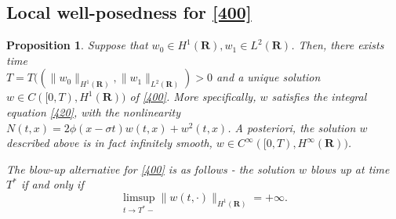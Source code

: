 \documentclass[12pt]{amsart}
\newtheorem{proposition}{Proposition}
\theoremstyle{definition}
\theoremstyle{remark}
\numberwithin{equation}{section}
\renewcommand{\(}{\left(}
\renewcommand{\)}{\right)}
\renewcommand{\[}{\left[}
\renewcommand{\]}{\right]}
\newcommand{\si}{\sigma}
\newcommand{\rone}{\mathbf R}
\begin{document}
\subsection{Local well-posedness for \eqref{400}}
\begin{proposition}
	\label{prop:54} 
	Suppose that $w_0\in H^1(\rone), w_1\in L^2(\rone)$. Then, there exists time \\  $T=T((\|w_0\|_{H^1(\rone)}, \|w_1\|_{L^2(\rone)})>0$ and a unique solution 
	$w\in C([0,T), H^1(\rone))$ of \eqref{400}. More specifically, $w$ satisfies the integral equation \eqref{420}, with the nonlinearity $N(t,x)=2\phi(x-\si t)w(t,x) +w^2(t,x)$. 
	A posteriori, the solution $w$ described above is in fact infinitely smooth, $w\in C^\infty([0,T), H^\infty(\rone))$. 
	
	The blow-up alternative for \eqref{400} is as follows - the solution $w$ blows up at time $T^*$ if and only if 
	\begin{equation}
		\label{90P}
		\limsup_{t\to T^*-} \|w(t, \cdot)\|_{H^1(\rone)}=+\infty. 
	\end{equation}
\end{proposition}
\end{document}

